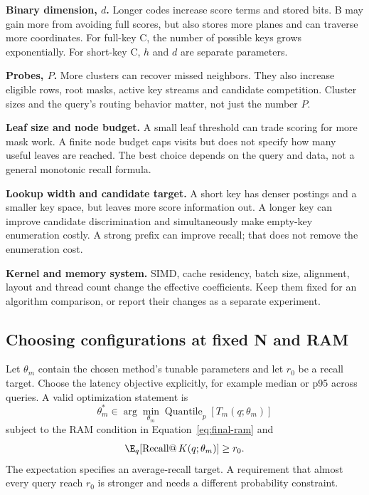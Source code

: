 \textbf{Binary dimension, $d$.} Longer codes increase score terms and stored bits. B may gain
more from avoiding full scores, but also stores more planes and can traverse more coordinates.
For full-key C, the number of possible keys grows exponentially. For short-key C, $h$ and $d$
are separate parameters.

\textbf{Probes, $P$.} More clusters can recover missed neighbors. They also increase eligible
rows, root masks, active key streams and candidate competition. Cluster sizes and the query's
routing behavior matter, not just the number $P$.

\textbf{Leaf size and node budget.} A small leaf threshold can trade scoring for more mask work.
A finite node budget caps visits but does not specify how many useful leaves are reached.
The best choice depends on the query and data, not a general monotonic recall formula.

\textbf{Lookup width and candidate target.} A short key has denser postings and a smaller key
space, but leaves more score information out. A longer key can improve candidate discrimination
and simultaneously make empty-key enumeration costly. A strong prefix can improve recall;
that does not remove the enumeration cost.

\textbf{Kernel and memory system.} SIMD, cache residency, batch size, alignment, layout and
thread count change the effective coefficients. Keep them fixed for an algorithm comparison,
or report their changes as a separate experiment.

\subsection{Choosing configurations at fixed N and RAM}
Let $\theta_m$ contain the chosen method's tunable parameters and let $r_0$ be a recall target.
Choose the latency objective explicitly, for example median or p95 across queries. A valid
optimization statement is
\begin{equation}
\theta_m^*\in\arg\min_{\theta_m}\operatorname{Quantile}_{p}[T_m(q;\theta_m)]
\end{equation}
subject to the RAM condition in Equation~\eqref{eq:final-ram} and
\begin{equation}
\E_q[\operatorname{Recall@}K(q;\theta_m)]\geq r_0.
\label{eq:optimization}
\end{equation}
The expectation specifies an average-recall target. A requirement that almost every query
reach $r_0$ is stronger and needs a different probability constraint.

